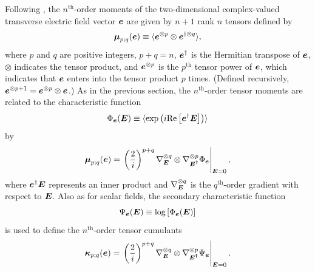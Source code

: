 \documentclass[twocolumn]{aastex6}
\newcommand{\mbf}[1]{\mbox{\boldmath $#1$}}
\newcommand{\mbfs}[1]{\mbox{\scriptsize\boldmath $#1$}}
\newcommand{\real}{{\rm Re}}
\newcommand{\re}[1]{\real\ensuremath{ \left[ {#1} \right] }}
\newcommand{\mean}[1]{\ensuremath{ \langle #1 \rangle }}
\begin{document}
Following \cite{agl96a}, the $n^\mathrm{th}$-order moments of the
two-dimensional complex-valued transverse electric field vector $\mbf{e}$ 
are given by $n+1$ rank $n$ tensors defined by
%
\begin{equation}
\mbf{\mu}_{p;q}(\mbf{e}) 
  \equiv \mean{ \mbf{e}^{\otimes p} \otimes \mbf{e}^{\dagger\otimes q} },
\label{eqn:nth_moment}
\end{equation}
%
where $p$ and $q$ are positive integers, $p+q=n$,
$\mbf{e}^\dagger$ is the Hermitian transpose of $\mbf{e}$,
$\otimes$ indicates the tensor product, and
$\mbf{e}^{\otimes p}$ is the $p^\mathrm{th}$ tensor power of $\mbf{e}$,
which indicates that $\mbf{e}$ enters into the tensor product $p$
times.
%
(Defined recursively, $\mbf{e}^{\otimes p+1} = \mbf{e}^{\otimes p} \otimes \mbf{e}$.)
%
As in the previous section, the $n^\mathrm{th}$-order tensor moments
are related to the characteristic function 
%
\begin{equation}
\Phi_{\mbfs{e}}(\mbf{E}) \equiv \langle \exp \left( i\re{\mbf{e}^\dagger\mbf{E}} \right) \rangle
\end{equation}
%
by
%
\begin{equation}
\mbf{\mu}_{p;q}(\mbf{e}) 
  = \left. 
    \left( \frac{2}{i} \right)^{p+q} 
    \nabla^{\otimes q}_{\mbfs{E}} \otimes \nabla^{\otimes p}_{\mbfs{E^\dagger}} \Phi_{\mbfs{e}}
   \right\vert_{\mbfs{E}=0},
\end{equation}
%
where $\mbf{e}^\dagger\mbf{E}$ represents an inner product and
$\nabla^{\otimes q}_{\mbfs{E}}$ is the $q^\mathrm{th}$-order gradient
with respect to $\mbf{E}$.
%
Also as for scalar fields, the secondary characteristic function
%
\begin{equation}
\Psi_{\mbfs{e}}(\mbf{E}) \equiv \log\left[\Phi_{\mbfs{e}}(\mbf{E})\right]
\end{equation}
is used to define the $n^\mathrm{th}$-order tensor cumulants
%
\begin{equation}
\mbf{\kappa}_{p;q}(\mbf{e}) 
  = \left. 
    \left( \frac{2}{i} \right)^{p+q} 
    \nabla^{\otimes q}_{\mbfs{E}} \otimes \nabla^{\otimes p}_{\mbfs{E^\dagger}} \Psi_{\mbfs{e}}
   \right\vert_{\mbfs{E}=0}.
\end{equation}
\end{document}

